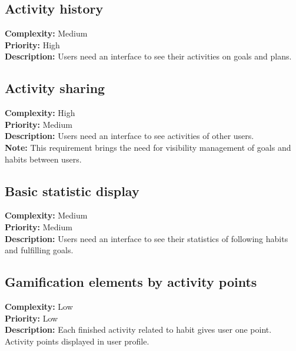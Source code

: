 \subsection{Activity history}\label{subsec:activity-history}
\textbf{Complexity:} Medium\\
\textbf{Priority:} High\\
\textbf{Description:} Users need an interface to see their activities on goals and plans.\\


\subsection{Activity sharing}\label{subsec:activity-sharing}
\textbf{Complexity:} High\\
\textbf{Priority:} Medium\\
\textbf{Description:} Users need an interface to see activities of other users.\\
\textbf{Note:} This requirement brings the need for visibility management of goals and habits between users.\\


\subsection{Basic statistic display}\label{subsec:basic-statistic-display}
\textbf{Complexity:} Medium\\
\textbf{Priority:} Medium\\
\textbf{Description:} Users need an interface to see their statistics of following habits and fulfilling goals.\\


\subsection{Gamification elements by activity points}\label{subsec:gamification-elements-by-activity-points}
\textbf{Complexity:} Low\\
\textbf{Priority:} Low\\
\textbf{Description:} Each finished activity related to habit gives user one point.
Activity points displayed in user profile.\\